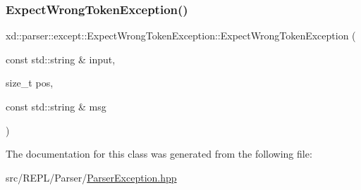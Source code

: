 \subsubsection{\texorpdfstring{Expect\+Wrong\+Token\+Exception()}{ExpectWrongTokenException()}}
{\footnotesize\ttfamily xd\+::parser\+::except\+::\+Expect\+Wrong\+Token\+Exception\+::\+Expect\+Wrong\+Token\+Exception (\begin{DoxyParamCaption}\item[{const std\+::string \&}]{input,  }\item[{size\+\_\+t}]{pos,  }\item[{const std\+::string \&}]{msg }\end{DoxyParamCaption})\hspace{0.3cm}{\ttfamily [inline]}}



The documentation for this class was generated from the following file\+:\begin{DoxyCompactItemize}
\item 
src/\+R\+E\+P\+L/\+Parser/\mbox{\hyperlink{_parser_exception_8hpp}{Parser\+Exception.\+hpp}}\end{DoxyCompactItemize}

